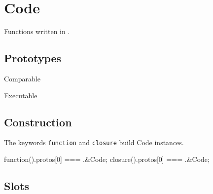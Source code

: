 
\section{Code}

Functions written in \us.

\subsection{Prototypes}

\begin{refObjects}
\item[Comparable]
\item[Executable]
\end{refObjects}

\subsection{Construction}

The keywords \lstinline|function| and \lstinline|closure| build Code
instances.

\begin{urbiassert}
function(){}.protos[0] === .&Code;
closure(){}.protos[0] === .&Code;
\end{urbiassert}

\subsection{Slots}

